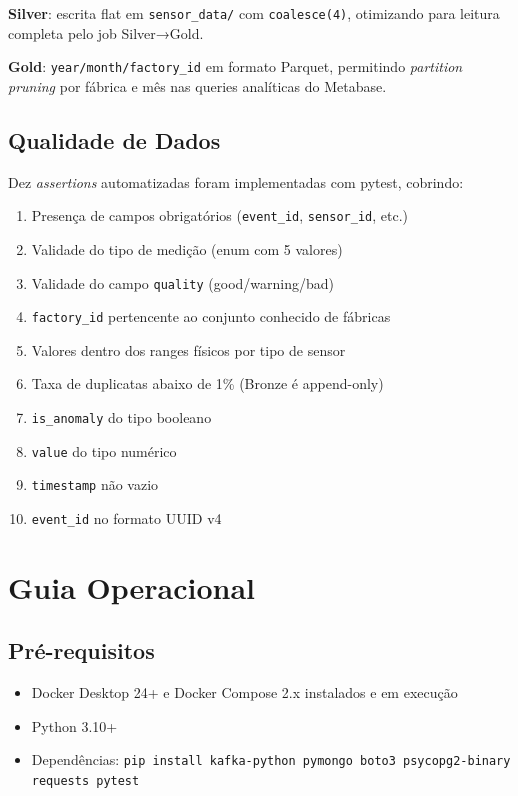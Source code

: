 \textbf{Silver}: escrita flat em \texttt{sensor\_data/} com \texttt{coalesce(4)},
otimizando para leitura completa pelo job Silver→Gold.

\textbf{Gold}: \texttt{year/month/factory\_id} em formato Parquet, permitindo
\textit{partition pruning} por fábrica e mês nas queries analíticas do Metabase.

\subsection{Qualidade de Dados}

Dez \textit{assertions} automatizadas foram implementadas com pytest, cobrindo:

\begin{enumerate}
    \item Presença de campos obrigatórios (\texttt{event\_id}, \texttt{sensor\_id}, etc.)
    \item Validade do tipo de medição (enum com 5 valores)
    \item Validade do campo \texttt{quality} (good/warning/bad)
    \item \texttt{factory\_id} pertencente ao conjunto conhecido de fábricas
    \item Valores dentro dos ranges físicos por tipo de sensor
    \item Taxa de duplicatas abaixo de 1\% (Bronze é append-only)
    \item \texttt{is\_anomaly} do tipo booleano
    \item \texttt{value} do tipo numérico
    \item \texttt{timestamp} não vazio
    \item \texttt{event\_id} no formato UUID v4
\end{enumerate}

\section{Guia Operacional}

\subsection{Pré-requisitos}

\begin{itemize}
    \item Docker Desktop 24+ e Docker Compose 2.x instalados e em execução
    \item Python 3.10+
    \item Dependências: \texttt{pip install kafka-python pymongo boto3 psycopg2-binary requests pytest}
\end{itemize}

